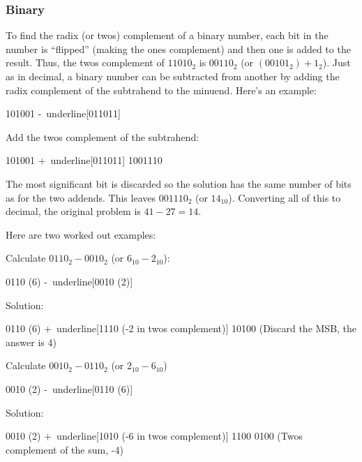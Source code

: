 \subsubsection{Binary}
\label{MO:subsub:binary_subtraction_with_radix_complement}

To find the radix (or twos) complement of a binary number, each bit in the number is ``flipped'' (making the ones complement) and then one is added to the result. Thus, the twos complement of $ 11010_2 $ is $ 00110_2 $ (or $ (00101_2)+1_2 $). Just as in decimal, a binary number can be subtracted from another by adding the radix complement of the subtrahend to the minuend. Here's an example: 

\begin{binDisp}[commandchars=~\[\]]
     101001
    -~underline[011011]
\end{binDisp}

Add the twos complement of the subtrahend:

\begin{binDisp}[commandchars=~\[\]]
     101001
    +~underline[011011]
    1001110
\end{binDisp}

The most significant bit is discarded so the solution has the same number of bits as for the two addends. This leaves $ 001110_2 $ (or $ 14_{10} $). Converting all of this to decimal, the original problem is $ 41-27=14 $.

Here are two worked out examples:

Calculate $ 0110_2 - 0010_2 $ (or $ 6_{10} - 2_{10} $):

\begin{binDisp}[commandchars=~\[\]]
     0110  (6)
    -~underline[0010  (2)]
\end{binDisp}

Solution:

\begin{binDisp}[commandchars=~\[\]]
     0110  (6)
    +~underline[1110  (-2 in twos complement)]
    10100  (Discard the MSB, the answer is 4)
\end{binDisp}

Calculate $ 0010_2 - 0110_2 $ (or $ 2_{10} - 6_{10} $)

\begin{binDisp}[commandchars=~\[\]]
     0010  (2)
    -~underline[0110  (6)]
\end{binDisp}

Solution:

\begin{binDisp}[commandchars=~\[\]]
     0010  (2)
    +~underline[1010  (-6 in twos complement)]
     1100
     0100  (Twos complement of the sum, -4)
\end{binDisp}


